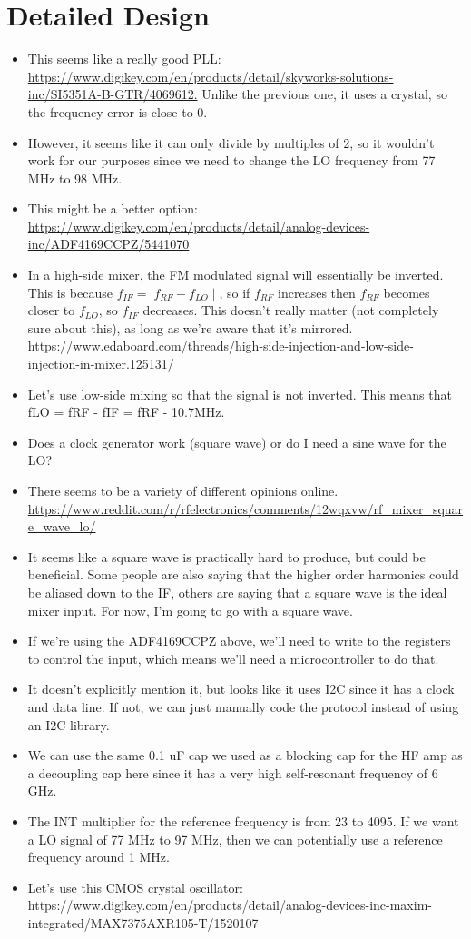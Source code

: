\documentclass[12pt, letterpaper]{article}
\begin{document}
\section{Detailed Design}

\begin{itemize}
    \item This seems like a really good PLL: \url{https://www.digikey.com/en/products/detail/skyworks-solutions-inc/SI5351A-B-GTR/4069612.} Unlike the previous one, it uses a crystal, so the frequency error is close to 0.
    \item However, it seems like it can only divide by multiples of 2, so it wouldn't work for our purposes since we need to change the LO frequency from 77 MHz to 98 MHz. 
    \item This might be a better option: \url{https://www.digikey.com/en/products/detail/analog-devices-inc/ADF4169CCPZ/5441070}
    \item In a high-side mixer, the FM modulated signal will essentially be inverted. This is because \(f_{IF} = \mid f_{RF} - f_{LO} \mid \), so if \(f_{RF}\) increases then \(f_{RF}\) becomes closer to \(f_{LO}\), so \(f_{IF}\) decreases. This doesn't really matter (not completely sure about this), as long as we're aware that it's mirrored. https://www.edaboard.com/threads/high-side-injection-and-low-side-injection-in-mixer.125131/
    \item Let's use low-side mixing so that the signal is not inverted. This means that fLO = fRF - fIF = fRF - 10.7MHz.
    \item Does a clock generator work (square wave) or do I need a sine wave for the LO?
    \item There seems to be a variety of different opinions online. \url{https://www.reddit.com/r/rfelectronics/comments/12wqxvw/rf_mixer_square_wave_lo/}
    \item It seems like a square wave is practically hard to produce, but could be beneficial. Some people are also saying that the higher order harmonics could be aliased down to the IF, others are saying that a square wave is the ideal mixer input. For now, I'm going to go with a square wave.
    \item If we're using the ADF4169CCPZ above, we'll need to write to the registers to control the input, which means we'll need a microcontroller to do that.
    \item It doesn't explicitly mention it, but looks like it uses I2C since it has a clock and data line. If not, we can just manually code the protocol instead of using an I2C library.
    \item We can use the same 0.1 uF cap we used as a blocking cap for the HF amp as a decoupling cap here since it has a very high self-resonant frequency of 6 GHz.
    \item The INT multiplier for the reference frequency is from 23 to 4095. If we want a LO signal of 77 MHz to 97 MHz, then we can potentially use a reference frequency around 1 MHz.
    \item Let's use this CMOS crystal oscillator: https://www.digikey.com/en/products/detail/analog-devices-inc-maxim-integrated/MAX7375AXR105-T/1520107
\end{itemize}
\end{document}
